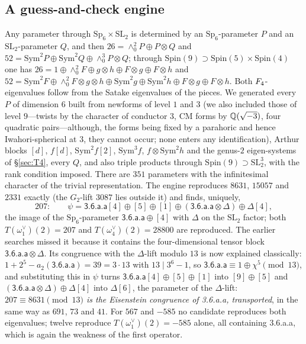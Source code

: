\documentclass[11pt]{amsart}
\theoremstyle{definition}
\begin{document}
\subsection{A guess-and-check engine}\label{sec:gc} Any parameter through $\mathrm{Sp}_6\times\mathrm{SL}_2$ is determined by an $\mathrm{Sp}_6$-parameter $P$ and an $\mathrm{SL}_2$-parameter $Q$, and then $26=\wedge^2_0P\oplus P\otimes Q$ and $52=\mathrm{Sym}^2P\oplus\mathrm{Sym}^2Q\oplus\wedge^3_0P\otimes Q$; through $\mathrm{Spin}(9)\supset\mathrm{Spin}(5)\times\mathrm{Spin}(4)$ one has $26=1\oplus\wedge^2_0F\oplus g\otimes h\oplus F\otimes g\oplus F\otimes h$ and $52=\mathrm{Sym}^2F\oplus\wedge^2_0F\otimes g\otimes h\oplus\mathrm{Sym}^2g\oplus\mathrm{Sym}^2h\oplus F\otimes g\oplus F\otimes h$. Both $F_4$-eigenvalues follow from the Satake eigenvalues of the pieces. We generated every $P$ of dimension $6$ built from newforms of level $1$ and $3$ (we also included those of level $9$---twists by the character of conductor $3$, CM forms by $\mathbb{Q}(\sqrt{-3})$, four quadratic pairs---although, the forms being fixed by a parahoric and hence Iwahori-spherical at $3$, they cannot occur; none enters any identification), Arthur blocks $[d]$, $f[d]$, $\mathrm{Sym}^2f[2]$, $\mathrm{Sym}^3f$, $f\otimes\mathrm{Sym}^2h$ and the genus-$2$ eigen-systems of \S\ref{sec:T4}, every $Q$, and also triple products through $\mathrm{Spin}(9)\supset\mathrm{SL}_2^3$, with the rank condition imposed. There are $351$ parameters with the infinitesimal character of the trivial representation. The engine reproduces $8631$, $15057$ and $2331$ exactly (the $G_2$-lift $3087$ lies outside it) and finds, uniquely,
\[207:\qquad\psi=\textsf{3.6.a.a}[4]\oplus[5]\oplus[1]\oplus(\textsf{3.6.a.a}\otimes\Delta)\oplus\Delta[4],\]
the image of the $\mathrm{Sp}_6$-parameter $\textsf{3.6.a.a}\oplus[4]$ with $\Delta$ on the $\mathrm{SL}_2$ factor; both $T(\omega_1^\vee)(2)=207$ and $T(\omega_4^\vee)(2)=28800$ are reproduced. The earlier searches missed it because it contains the four-dimensional tensor block $\textsf{3.6.a.a}\otimes\Delta$. Its congruence with the $\Delta$-lift modulo $13$ is now explained classically: $1+2^5-a_2(\textsf{3.6.a.a})=39=3\cdot13$ with $13\mid3^6-1$, so $\textsf{3.6.a.a}\equiv1\oplus\chi^5\pmod{13}$, and substituting this in $\psi$ turns $\textsf{3.6.a.a}[4]\oplus[5]\oplus[1]$ into $[9]\oplus[5]$ and $(\textsf{3.6.a.a}\otimes\Delta)\oplus\Delta[4]$ into $\Delta[6]$, the parameter of the $\Delta$-lift: \emph{$207\equiv8631\pmod{13}$ is the Eisenstein congruence of \textsf{3.6.a.a}, transported}, in the same way as $691$, $73$ and $41$. For $567$ and $-585$ no candidate reproduces both eigenvalues; twelve reproduce $T(\omega_1^\vee)(2)=-585$ alone, all containing \textsf{3.6.a.a}, which is again the weakness of the first operator.
\end{document}
